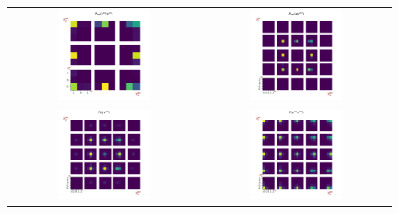 \begin{figure}[hp]
\begin{tabular}{cc}
\includegraphics[width=0.5\textwidth]{figures/mm_ext_1.png}
&
\includegraphics[width=0.5\textwidth]{figures/mm_ext_2.png} \\
\includegraphics[width=0.5\textwidth]{figures/mm_ext_3.png}
&
\includegraphics[width=0.5\textwidth]{figures/mm_ext_4.png}

\end{tabular}
\end{figure}
